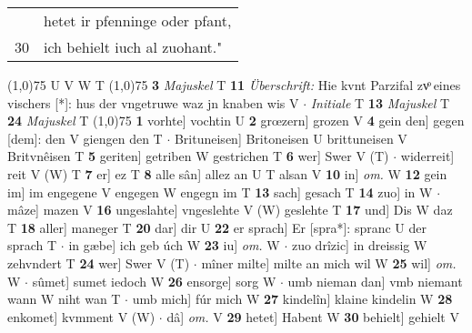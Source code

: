 \documentclass[8pt,a4paper,notitlepage]{article}
\begin{document}
\begin{table}[ht]
\begin{minipage}[t]{0.5\linewidth}
\begin{tabular}{rl}
 & hetet ir pfenninge oder pfant,\\ 
30 & ich behielt iuch al zuohant."\\ 
\end{tabular}
\scriptsize
\line(1,0){75} \newline
U V W T \newline
\line(1,0){75} \newline
\textbf{3} \textit{Majuskel} T  \textbf{11} \textit{Überschrift:} Hie kvnt Parzifal zvͦ eines vischers [*]: hus der vngetruwe waz jn knaben wis V   $\cdot$ \textit{Initiale} T  \textbf{13} \textit{Majuskel} T  \textbf{24} \textit{Majuskel} T  \newline
\line(1,0){75} \newline
\textbf{1} vorhte] vochtin U \textbf{2} grœzern] grozen V \textbf{4} gein den] gegen [dem]: den V giengen den T  $\cdot$ Brituneisen] Britoneisen U brittuneisen V Britvnêisen T \textbf{5} geriten] getriben W gestrichen T \textbf{6} wer] Swer V (T)  $\cdot$ widerreit] reit V (W) T \textbf{7} er] ez T \textbf{8} alle sân] allez an U T alsan V \textbf{10} in] \textit{om.} W \textbf{12} gein im] im engegene V engegen W engegn im T \textbf{13} sach] gesach T \textbf{14} zuo] in W  $\cdot$ mâze] mazen V \textbf{16} ungeslahte] vngeslehte V (W) geslehte T \textbf{17} und] Dis W daz T \textbf{18} aller] maneger T \textbf{20} dar] dir U \textbf{22} er sprach] Er [spra*]: spranc U der sprach T  $\cdot$ in gæbe] ich geb úch W \textbf{23} iu] \textit{om.} W  $\cdot$ zuo drîzic] in dreissig W zehvndert T \textbf{24} wer] Swer V (T)  $\cdot$ mîner milte] milte an mich wil W \textbf{25} wil] \textit{om.} W  $\cdot$ sûmet] sumet iedoch W \textbf{26} ensorge] sorg W  $\cdot$ umb nieman dan] vmb niemant wann W niht wan T  $\cdot$ umb mich] fúr mich W \textbf{27} kindelîn] klaine kindelin W \textbf{28} enkomet] kvmment V (W)  $\cdot$ dâ] \textit{om.} V \textbf{29} hetet] Habent W \textbf{30} behielt] gehielt V \newline
\end{minipage}
\end{table}
\end{document}
